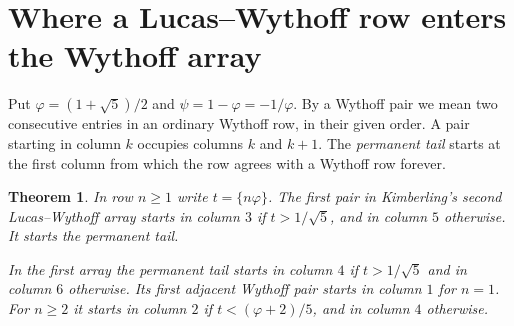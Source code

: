 \documentclass[10pt]{article}
\newtheorem{theorem}{Theorem}[section]
\newcommand{\ph}{\varphi}
\newcommand{\fr}[1]{\{#1\}}
\begin{document}
\section{Where a Lucas--Wythoff row enters the Wythoff array}
Put $\ph=(1+\sqrt5)/2$ and $\psi=1-\ph=-1/\ph$. By a Wythoff pair we mean two consecutive entries in an ordinary Wythoff row, in their given order. A pair starting in column $k$ occupies columns $k$ and $k+1$. The \emph{permanent tail} starts at the first column from which the row agrees with a Wythoff row forever.
\begin{theorem}\label{entry}
In row $n\ge1$ write $t=\fr{n\ph}$. The first pair in Kimberling's second Lucas--Wythoff array starts in column $3$ if $t>1/\sqrt5$, and in column $5$ otherwise. It starts the permanent tail.

In the first array the permanent tail starts in column $4$ if $t>1/\sqrt5$ and in column $6$ otherwise. Its first adjacent Wythoff pair starts in column $1$ for $n=1$. For $n\ge2$ it starts in column $2$ if $t<(\ph+2)/5$, and in column $4$ otherwise.
\end{theorem}
\end{document}
